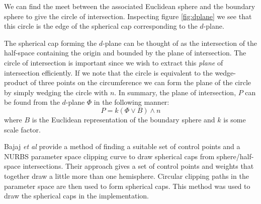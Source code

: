 We can find the meet between the associated Euclidean sphere and the
boundary sphere to give the circle of intersection. Inspecting figure
\ref{fig:dplane} we
see that this circle is the edge of the spherical
cap corresponding to the $d$-plane.

The spherical cap forming the $d$-plane can be thought of as the
intersection of the half-space containing the origin and bounded
by the plane of intersection.
The circle of intersection is important since we wish to extract
this \emph{plane} of intersection efficiently. 
If we note that the circle is equivalent to the wedge-product of three
points on the circumference we can form the plane of the circle
by simply wedging the circle with $n$. In summary,
the plane of intersection, $P$ can be found from the $d$-plane $\Phi$ in
the following manner:
\[
P = k (\Phi \vee B) \wedge n
\]
where $B$ is the Euclidean representation of the boundary sphere
and $k$ is some scale factor.


Bajaj \emph{et al}\cite{spherecap} provide a method of finding
a suitable set of control points and a NURBS parameter space clipping
curve to draw spherical caps from sphere/half-space intersections.
Their approach gives a set of control points and weights that together
draw a little more than one hemisphere. Circular clipping paths in the 
parameter space are then used to form spherical caps.
This method was used to draw the spherical caps in the implementation.

